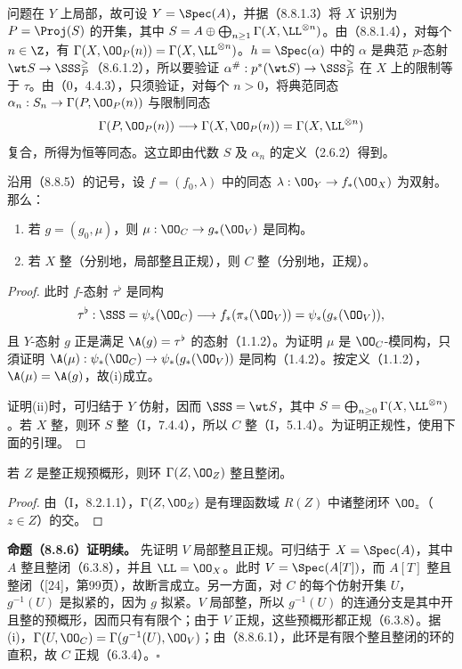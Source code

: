 问题在 $Y$ 上局部，故可设 $Y=\Spec(A)$，并据（8.8.1.3）将 $X$ 识别为 $P=\Proj(S)$ 的开集，其中 $S=A\oplus\bigoplus_{n\geq1}\Gamma(X,\LL^{\otimes n})$。由（8.8.1.4），对每个 $n\in\Z$，有 $\Gamma(X,\OO_P(n))=\Gamma(X,\LL^{\otimes n})$。$h=\Spec(\alpha)$ 中的 $\alpha$ 是典范 $p$-态射 $\wt S\to\SSS_P^{\geq}$（8.6.1.2），所以要验证 $\alpha^\#:p^*(\wt S)\to\SSS_P^{\geq}$ 在 $X$ 上的限制等于 $\tau$。由（0，4.4.3），只须验证，对每个 $n>0$，将典范同态 $\alpha_n:S_n\to\Gamma(P,\OO_P(n))$ 与限制同态
\[\Gamma(P,\OO_P(n))\longrightarrow\Gamma(X,\OO_P(n))=\Gamma(X,\LL^{\otimes n})\]
复合，所得为恒等同态。这立即由代数 $S$ 及 $\alpha_n$ 的定义（2.6.2）得到。

 沿用（8.8.5）的记号，设 $f=(f_0,\lambda)$ 中的同态 $\lambda:\OO_Y\to f_*(\OO_X)$ 为双射。那么：
\begin{enumerate}[label=(\roman*)]
\item 若 $g=(g_0,\mu)$，则 $\mu:\OO_C\to g_*(\OO_V)$ 是同构。
\item 若 $X$ 整（分别地，局部整且正规），则 $C$ 整（分别地，正规）。
\end{enumerate}
\begin{proof}
此时 $f$-态射 $\tau^\flat$ 是同构
\[\tau^\flat:\SSS=\psi_*(\OO_C)\longrightarrow f_*(\pi_*(\OO_V))=\psi_*(g_*(\OO_V)),\]
且 $Y$-态射 $g$ 正是满足 $\A(g)=\tau^\flat$ 的态射（1.1.2）。为证明 $\mu$ 是 $\OO_C$-模同构，只須证明 $\A(\mu):\psi_*(\OO_C)\to\psi_*(g_*(\OO_V))$ 是同构（1.4.2）。按定义（1.1.2），$\A(\mu)=\A(g)$，故(i)成立。

\begin{sloppypar}
证明(ii)时，可归结于 $Y$ 仿射，因而 $\SSS=\wt S$，其中 $S=\bigoplus_{n\geq0}\Gamma(X,\LL^{\otimes n})$。若 $X$ 整，则环 $S$ 整（I，7.4.4），所以 $C$ 整（I，5.1.4）。为证明正规性，使用下面的引理。
\end{sloppypar}
\end{proof}

 若 $Z$ 是整正规预概形，则环 $\Gamma(Z,\OO_Z)$ 整且整闭。
\begin{proof}
由（I，8.2.1.1），$\Gamma(Z,\OO_Z)$ 是有理函数域 $R(Z)$ 中诸整闭环 $\OO_z$（$z\in Z$）的交。
\end{proof}

\noindent\textbf{命题（8.8.6）证明续。} 先证明 $V$ 局部整且正规。可归结于 $X=\Spec(A)$，其中 $A$ 整且整闭（6.3.8），并且 $\LL=\OO_X$。此时 $V=\Spec(A[T])$，而 $A[T]$ 整且整闭（[24]，第99页），故断言成立。另一方面，对 $C$ 的每个仿射开集 $U$，$g^{-1}(U)$ 是拟紧的，因为 $g$ 拟紧。$V$ 局部整，所以 $g^{-1}(U)$ 的连通分支是其中开且整的预概形，因而只有有限个；由于 $V$ 正规，这些预概形都正规（6.3.8）。据(i)，$\Gamma(U,\OO_C)=\Gamma(g^{-1}(U),\OO_V)$；由（8.8.6.1），此环是有限个整且整闭的环的直积，故 $C$ 正规（6.3.4）。\hfill$\square$

